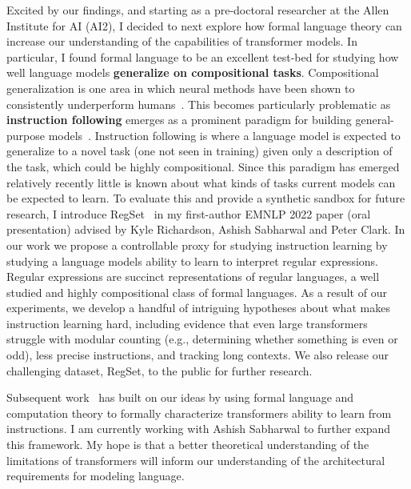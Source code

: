 \documentclass[12pt]{article}
\begin{document}
Excited by our findings,
and starting as a pre-doctoral researcher at the Allen Institute for AI (AI2),
I decided to next explore how formal language theory 
can increase our understanding of the capabilities of transformer models.
In particular, I found formal language to be an excellent test-bed for
studying how well language models 
\textbf{generalize on compositional tasks}. 
Compositional generalization is one area in which 
neural methods have been shown 
to consistently underperform humans~\cite{Lake2018GeneralizationWS}.
This becomes particularly problematic 
as \textbf{instruction following} emerges 
as a prominent paradigm
for building general-purpose models~\cite{mishra2021crosstask, Wei2021FinetunedLM}. 
Instruction following is where a language model is expected to generalize to a novel task
(one not seen in training) given only a description of the task, 
which could be highly compositional.
Since this paradigm has emerged relatively recently
little is known about what kinds of tasks current models can be expected to learn.
To evaluate this and provide a synthetic sandbox for future research,
I introduce RegSet~\cite{Finlayson2022WhatMI} in my first-author EMNLP 2022 paper 
(oral presentation) 
advised by Kyle Richardson, Ashish Sabharwal and Peter Clark. 
In our work we propose a controllable proxy for studying instruction learning
by studying a language models ability to learn to interpret regular expressions.
Regular expressions are succinct representations of regular languages, 
a well studied and highly compositional class of formal languages.
As a result of our experiments,
we develop a handful of intriguing hypotheses 
about what makes instruction learning hard, 
including evidence that even large transformers struggle with modular counting 
(e.g., determining whether something is even or odd), 
less precise instructions, and tracking long contexts. 
We also release our challenging dataset, RegSet, to the public for further research.

Subsequent work~\cite{Merrill2022LogPrecisionTA} 
has built on our ideas by using formal language and computation theory
to formally characterize transformers ability to learn from instructions.
I am currently working with Ashish Sabharwal 
to further expand this framework.
My hope is that a better theoretical understanding 
of the limitations of transformers will inform 
our understanding of the architectural requirements 
for modeling language.
\end{document}
